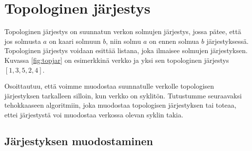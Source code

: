 \section{Topologinen järjestys}

Topologinen järjestys on suunnatun verkon solmujen järjestys,
jossa pätee, että jos solmusta $a$ on kaari solmuun $b$,
niin solmu $a$ on ennen solmua $b$ järjestyksessä.
Topologinen järjestys voidaan esittää listana,
joka ilmaisee solmujen järjestyksen.
Kuvassa \ref{fig:topjar} on esimerkkinä verkko ja yksi sen topologinen
järjestys $[1,3,5,2,4]$.

Osoittautuu, että voimme muodostaa suunnatulle verkolle
topologisen järjestyksen tarkalleen silloin,
kun verkko on syklitön.
Tutustumme seuraavaksi tehokkaaseen algoritmiin,
joka muodostaa topologisen järjestyksen
tai toteaa, ettei järjestystä voi muodostaa
verkossa olevan syklin takia.

\subsection{Järjestyksen muodostaminen}

